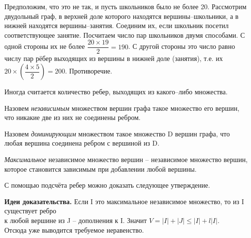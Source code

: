 \begin{prf}
    Предположим, что это не так, и пусть школьников было не более 20. Рассмотрим двудольный граф, в верхней доле которого находятся вершины--школьники, а в нижней находятся вершины--занятия. Соединим их, если школьник посетил соответствующее занятие. Посчитаем число пар школьников двумя способами. С одной стороны их не более $\dfrac{20 \times 19}{2} = 190$. С другой стороны это число равно числу пар рёбер выходящих из вершины в нижней доле (занятия), т.е. их $20 \times (\dfrac{4 \times 5}{2}) = 200$. Противоречие.
\end{prf}

Иногда считается количество ребер, выходящих из какого--либо множества.

\begin{dfn}
    Назовем \textit{независимым} множеством вершин графа такое множество его вершин, что никакие две из них не соединены ребром.
\end{dfn}

\begin{dfn}
    Назовем \textit{доминирующим} множеством такое множество D вершин графа, что любая вершина соединена ребром с вершиной из D.
\end{dfn}

\begin{dfn}
    \textit{Максимальное} независимое множество вершин -- независимое множество вершин, которое становится зависимым при добавлении любой вершины.
\end{dfn}

С помощью подсчёта ребер можно доказать следующее утверждение.


\textbf{Идеи доказательства.} Если I это максимальное независимое множество, то из I существует ребро
\\ к любой вершине из J -- дополнения к I. Значит $V = |I| + |J| \leq |I| + l |I|$.
\\  
Отсюда уже выводится требуемое неравенство.    